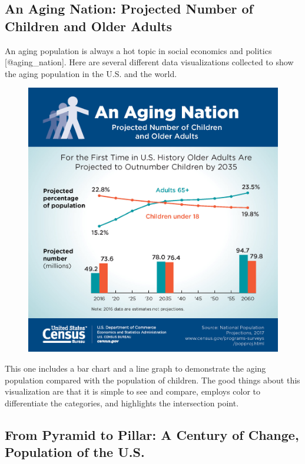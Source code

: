 \documentclass[]{book}
\theoremstyle{definition}
\theoremstyle{definition}
\theoremstyle{definition}
\theoremstyle{remark}
\begin{document}
\subsection{An Aging Nation: Projected Number of Children and Older
Adults}\label{an-aging-nation-projected-number-of-children-and-older-adults}

An aging population is always a hot topic in social economics and
politics {[}@aging\_nation{]}. Here are several different data
visualizations collected to show the aging population in the U.S. and
the world.

\begin{figure}
\centering
\includegraphics{images/aging_nation.jpg}
\caption{}
\end{figure}

This one includes a bar chart and a line graph to demonstrate the aging
population compared with the population of children. The good things
about this visualization are that it is simple to see and compare,
employs color to differentiate the categories, and highlights the
intersection point.

\subsection{From Pyramid to Pillar: A Century of Change, Population of
the
U.S.}\label{from-pyramid-to-pillar-a-century-of-change-population-of-the-u.s.}
\end{document}
